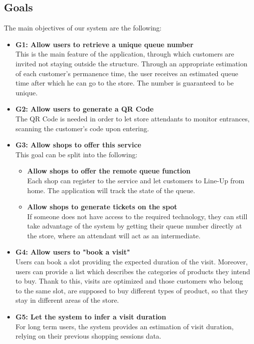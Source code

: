 \documentclass[table, 12pt]{article}
\begin{document}
\subsection{Goals}
The main objectives of our system are the following:
\begin{itemize}
    \item {\textbf{G1: Allow users to retrieve a unique queue number}\\This is the main feature of the application, through which customers are invited not staying outside the structure. Through an appropriate estimation of each customer's permanence time, the user receives an estimated queue time after which he can go to the store. The number is guaranteed to be unique.}
    \item {\textbf{G2: Allow users to generate a QR Code}\\The QR Code is needed in order to let store attendants to monitor entrances, scanning the customer's code upon entering.}
    \item {\textbf{G3: Allow shops to offer this service}\\This goal can be split into the following:
          \begin{itemize}
              \item {\textbf{Allow shops to offer the remote queue function}\\Each shop can register to the service and let customers to Line-Up from home. The application will track the state of the queue.}
              \item {\textbf{Allow shops to generate tickets on the spot}\\If someone does not have access to the required technology, they can still take advantage of the system by getting their queue number directly at the store, where an attendant will act as an intermediate.}
          \end{itemize}
          }
    \item {\textbf{G4: Allow users to "book a visit"}\\Users can book a slot providing the expected duration of the visit. Moreover, users can provide a list which describes the categories of products they intend to buy. Thank to this, visits are optimized and those customers who belong to the same slot, are supposed to buy different types of product, so that they stay in different areas of the store.}
    \item {\textbf{G5: Let the system to infer a visit duration}\\For long term users, the system provides an estimation of visit duration, relying on their previous shopping sessions data.}

\end{itemize}
\end{document}
